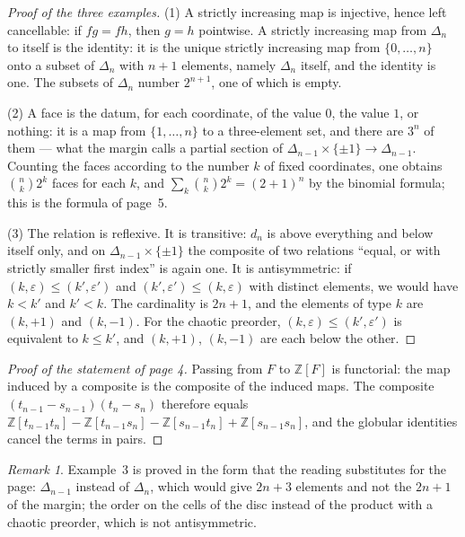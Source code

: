 \documentclass[11pt]{article}
\newcommand{\q}[1]{“#1”}
\theoremstyle{plain}
\theoremstyle{definition}
\theoremstyle{remark}
\newtheorem*{remarque}{Remark}
\begin{document}
\begin{proof}[Proof of the three examples]
(1) A strictly increasing map is injective, hence left cancellable: if $fg = fh$, then $g = h$ pointwise. A strictly increasing map from $\Delta_n$ to itself is the identity: it is the unique strictly increasing map from $\{0, \dots, n\}$ onto a subset of $\Delta_n$ with $n + 1$ elements, namely $\Delta_n$ itself, and the identity is one. The subsets of $\Delta_n$ number $2^{n+1}$, one of which is empty.

(2) A face is the datum, for each coordinate, of the value $0$, the value $1$, or nothing: it is a map from $\{1, \dots, n\}$ to a three-element set, and there are $3^n$ of them --- what the margin calls a partial section of $\Delta_{n-1} \times \{\pm 1\} \to \Delta_{n-1}$. Counting the faces according to the number $k$ of fixed coordinates, one obtains $\binom nk 2^k$ faces for each $k$, and $\sum_k \binom nk 2^k = (2 + 1)^n$ by the binomial formula; this is the formula of page~5.

(3) The relation is reflexive. It is transitive: $d_n$ is above everything and below itself only, and on $\Delta_{n-1} \times \{\pm 1\}$ the composite of two relations \q{equal, or with strictly smaller first index} is again one. It is antisymmetric: if $(k, \varepsilon) \leq (k', \varepsilon')$ and $(k', \varepsilon') \leq (k, \varepsilon)$ with distinct elements, we would have $k < k'$ and $k' < k$. The cardinality is $2n + 1$, and the elements of type $k$ are $(k, +1)$ and $(k, -1)$. For the chaotic preorder, $(k, \varepsilon) \leq (k', \varepsilon')$ is equivalent to $k \leq k'$, and $(k, +1)$, $(k, -1)$ are each below the other.
\end{proof}

\begin{proof}[Proof of the statement of page 4]
Passing from $F$ to $\mathbb Z[F]$ is functorial: the map induced by a composite is the composite of the induced maps. The composite $(t_{n-1} - s_{n-1})(t_n - s_n)$ therefore equals $\mathbb Z[t_{n-1}t_n] - \mathbb Z[t_{n-1}s_n] - \mathbb Z[s_{n-1}t_n] + \mathbb Z[s_{n-1}s_n]$, and the globular identities cancel the terms in pairs.
\end{proof}

\begin{remarque}
Example~3 is proved in the form that the reading substitutes for the page: $\Delta_{n-1}$ instead of $\Delta_n$, which would give $2n + 3$ elements and not the $2n + 1$ of the margin; the order on the cells of the disc instead of the product with a chaotic preorder, which is not antisymmetric.
\end{remarque}
\end{document}
